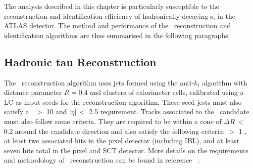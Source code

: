 	The analysis described in this chapter is particularly susceptible to the reconstruction and identification efficiency of hadronically decaying \ltau s, in the \ac{ATLAS} detector. 
	The method and performance of the \htau\ reconstruction and identification algorithms are thus summarised in the following paragraphs. 	
	
	\subsection*{Hadronic tau Reconstruction}
	The \htau\ reconstruction algorithm uses jets formed using the anti-$k_t$ algorithm with distance parameter $R=0.4$ and clusters of calorimeter cells, calibrated using a \ac{LC} as input seeds  for the reconstruction algorithm. These seed jests must also satisfy a \pt\ $>$ 10 \gev and $|\eta|\,<$ 2.5 requirement. Tracks associated to the \htau\ candidate must also follow some criteria. They are required to be within a cone of $\Delta R\,<$ 0.2 around the \htau candidate direction and also satisfy the following criteria: \pt $>$ 1 \gev, at least two associated hits in the pixel detector (including \ac{IBL}), and at least seven hits total in the pixel and \ac{SCT} detector. More details on the requirements and methodology of \htau\ reconstruction can be found in reference ~\cite{ATL-PHYS-PUB-2015-045}.
	
